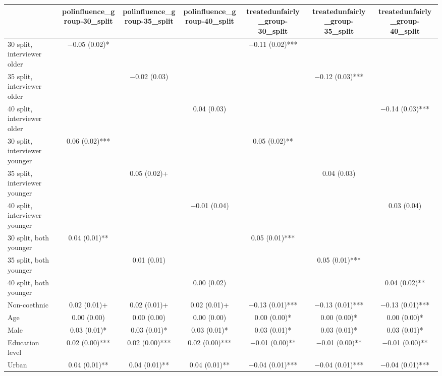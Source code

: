 \begin{table}
\centering
\begin{tabular}[t]{lcccccc}
\toprule
  & polinfluence\_group-30\_split & polinfluence\_group-35\_split & polinfluence\_group-40\_split & treatedunfairly\_group-30\_split & treatedunfairly\_group-35\_split & treatedunfairly\_group-40\_split\\
\midrule
30 split, interviewer older & \num{-0.05} (\num{0.02})* &  &  & \num{-0.11} (\num{0.02})*** &  & \\
35 split, interviewer older &  & \num{-0.02} (\num{0.03}) &  &  & \num{-0.12} (\num{0.03})*** & \\
40 split, interviewer older &  &  & \num{0.04} (\num{0.03}) &  &  & \num{-0.14} (\num{0.03})***\\
30 split, interviewer younger & \num{0.06} (\num{0.02})*** &  &  & \num{0.05} (\num{0.02})** &  & \\
35 split, interviewer younger &  & \num{0.05} (\num{0.02})+ &  &  & \num{0.04} (\num{0.03}) & \\
40 split, interviewer younger &  &  & \num{-0.01} (\num{0.04}) &  &  & \num{0.03} (\num{0.04})\\
30 split, both younger & \num{0.04} (\num{0.01})** &  &  & \num{0.05} (\num{0.01})*** &  & \\
35 split, both younger &  & \num{0.01} (\num{0.01}) &  &  & \num{0.05} (\num{0.01})*** & \\
40 split, both younger &  &  & \num{0.00} (\num{0.02}) &  &  & \num{0.04} (\num{0.02})**\\
Non-coethnic & \num{0.02} (\num{0.01})+ & \num{0.02} (\num{0.01})+ & \num{0.02} (\num{0.01})+ & \num{-0.13} (\num{0.01})*** & \num{-0.13} (\num{0.01})*** & \num{-0.13} (\num{0.01})***\\
Age & \num{0.00} (\num{0.00}) & \num{0.00} (\num{0.00}) & \num{0.00} (\num{0.00}) & \num{0.00} (\num{0.00})* & \num{0.00} (\num{0.00})* & \num{0.00} (\num{0.00})*\\
Male & \num{0.03} (\num{0.01})* & \num{0.03} (\num{0.01})* & \num{0.03} (\num{0.01})* & \num{0.03} (\num{0.01})* & \num{0.03} (\num{0.01})* & \num{0.03} (\num{0.01})*\\
Education level & \num{0.02} (\num{0.00})*** & \num{0.02} (\num{0.00})*** & \num{0.02} (\num{0.00})*** & \num{-0.01} (\num{0.00})** & \num{-0.01} (\num{0.00})** & \num{-0.01} (\num{0.00})**\\
Urban & \num{0.04} (\num{0.01})** & \num{0.04} (\num{0.01})** & \num{0.04} (\num{0.01})** & \num{-0.04} (\num{0.01})*** & \num{-0.04} (\num{0.01})*** & \num{-0.04} (\num{0.01})***\\

\end{tabular}
\end{table}
